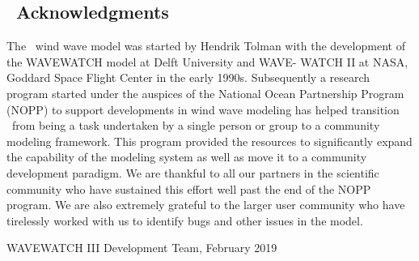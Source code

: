 \vssub
\subsection{~Acknowledgments}
\vssub

The \ws\ wind wave model was started by Hendrik Tolman with the development of the WAVEWATCH model at Delft University and WAVE-
WATCH II at NASA, Goddard Space Flight Center in the early 1990s.
Subsequently a research program started under the auspices of the National Ocean Partnership Program (NOPP) to support developments in wind wave modeling has helped transition \ws\ from being a task undertaken by a single person or group to a community modeling framework. This program provided the resources to significantly expand the capability of the modeling system as well as move it to a community development paradigm. We are thankful to all our partners in the scientific community who have sustained this effort well past the end of the NOPP program. We are also extremely grateful to the larger user community who have tirelessly worked with us to  identify bugs and other issues in the model. 
\vspace{\baselineskip}
\vspace{\baselineskip} 
\strut \hfill WAVEWATCH III Development Team, February 2019

